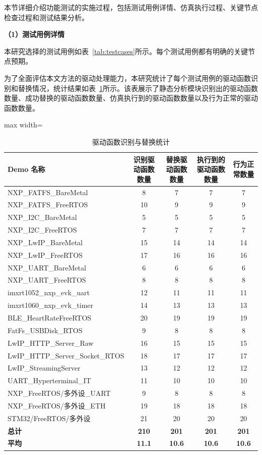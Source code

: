 本节详细介绍功能测试的实施过程，包括测试用例详情、仿真执行过程、关键节点检查过程和测试结果分析。

\textbf{（1）测试用例详情}

本研究选择的测试用例如表~\ref{tab:testcases}所示。每个测试用例都有明确的关键节点预期。

为了全面评估本文方法的驱动处理能力，本研究统计了每个测试用例的驱动函数识别和替换情况，统计结果如表~\ref{tab:driver_stats}所示。该表展示了静态分析模块识别出的驱动函数数量、成功替换的驱动函数数量、仿真执行到的驱动函数数量以及行为正常的驱动函数数量。

\begin{table}[htbp]
\centering
\caption{驱动函数识别与替换统计}
\label{tab:driver_stats}
\small
\begin{adjustbox}{max width=\textwidth}
\begin{tabular}{lcccc}
\toprule
\textbf{Demo 名称} & \textbf{识别驱动函数数量} & \textbf{替换驱动函数数量} & \textbf{执行到的驱动函数数量} & \textbf{行为正常数量} \\
\midrule
NXP\_FATFS\_BareMetal & 8 & 7 & 7 & 7 \\
NXP\_FATFS\_FreeRTOS & 10 & 9 & 9 & 9 \\
NXP\_I2C\_BareMetal & 5 & 5 & 5 & 5 \\
NXP\_I2C\_FreeRTOS & 7 & 7 & 7 & 7 \\
NXP\_LwIP\_BareMetal & 15 & 14 & 14 & 14 \\
NXP\_LwIP\_FreeRTOS & 17 & 16 & 16 & 16 \\
NXP\_UART\_BareMetal & 6 & 6 & 6 & 6 \\
NXP\_UART\_FreeRTOS & 8 & 8 & 8 & 8 \\
imxrt1052\_nxp\_evk\_uart & 12 & 11 & 11 & 11 \\
imxrt1060\_nxp\_evk\_timer & 14 & 13 & 13 & 13 \\
BLE\_HeartRateFreeRTOS & 20 & 19 & 19 & 19 \\
FatFs\_USBDisk\_RTOS & 9 & 8 & 8 & 8 \\
LwIP\_HTTP\_Server\_Raw & 16 & 15 & 15 & 15 \\
LwIP\_HTTP\_Server\_Socket\_RTOS & 18 & 17 & 17 & 17 \\
LwIP\_StreamingServer & 13 & 12 & 12 & 12 \\
UART\_Hyperterminal\_IT & 11 & 10 & 10 & 10 \\
NXP\_FreeRTOS/多外设\_UART & 9 & 8 & 8 & 8 \\
NXP\_FreeRTOS/多外设\_ETH & 19 & 18 & 18 & 18 \\
STM32/FreeRTOS/多外设 & 21 & 20 & 20 & 20 \\
\midrule
\textbf{总计} & \textbf{210} & \textbf{201} & \textbf{201} & \textbf{201} \\
\midrule
\textbf{平均} & \textbf{11.1} & \textbf{10.6} & \textbf{10.6} & \textbf{10.6} \\
\bottomrule
\end{tabular}
\end{adjustbox}
\end{table}

